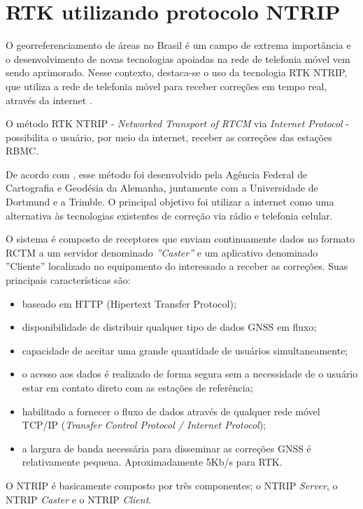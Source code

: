 \section{RTK utilizando protocolo NTRIP}
\noindent

O georreferenciamento de áreas no Brasil é um campo de extrema importância e o desenvolvimento de novas tecnologias apoiadas na rede de telefonia móvel vem sendo aprimorado. Nesse contexto, destaca-se o uso da tecnologia RTK NTRIP, que utiliza a rede de telefonia móvel para receber correções em tempo real, através da internet \citep{LENZ2004}.

O método RTK NTRIP - \textit{Networked Transport of RTCM} via \textit{Internet Protocol} - possibilita o usuário, por meio da internet, receber as correções das estações RBMC.

De acordo com \cite{LENZ2004} , esse método foi desenvolvido pela Agência Federal de Cartografia e Geodésia da Alemanha, juntamente com a Universidade de Dortmund e a Trimble. O principal objetivo foi utilizar a internet como uma alternativa às tecnologias existentes de correção via rádio e telefonia celular.

O sistema é composto de receptores que enviam continuamente dados no formato RCTM a um servidor denominado \textit{''Caster''} e um aplicativo denominado ''Cliente'' localizado no equipamento do interessado a receber as correções. Suas principais características são:

\begin{itemize}
    \item baseado em HTTP (Hipertext Transfer Protocol);
    \item disponibilidade de distribuir qualquer tipo de dados GNSS em fluxo;
    \item capacidade de aceitar uma grande quantidade de usuários simultaneamente;
    \item o acesso aos dados é realizado de forma segura sem a necessidade de o usuário estar em contato direto com as estações de referência;
    \item habilitado a fornecer o fluxo de dados através de qualquer rede móvel TCP/IP (\textit{Transfer Control Protocol / Internet Protocol});
    \item a largura de banda necessária para disseminar as correções GNSS é relativamente pequena. Aproximadamente 5Kb/s para RTK.
\end{itemize}


O NTRIP é basicamente composto por três componentes; o NTRIP \textit{Server}, o NTRIP \textit{Caster} e o NTRIP \textit{Client}.



